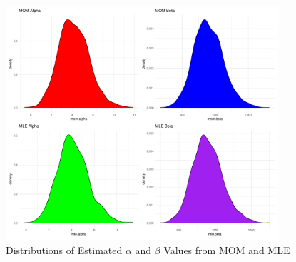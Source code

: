 \documentclass{article}\usepackage[]{graphicx}\usepackage[]{xcolor}
\begin{document}
\begin{figure}[h]
\centering
\includegraphics[width=0.9\textwidth]{alpha_beta_densities.pdf}
\caption{Distributions of Estimated $\alpha$ and $\beta$ Values from MOM and MLE}
\end{figure}
\end{document}
